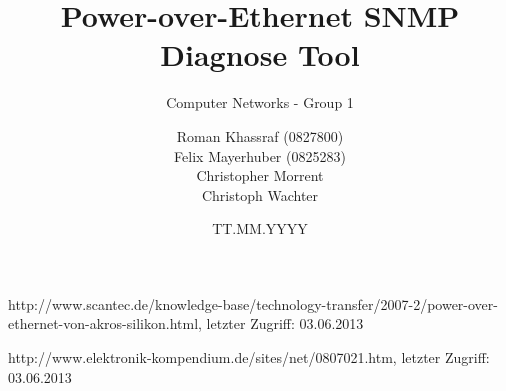 \documentclass[a4paper, 12pt]{scrartcl}
\title{Power-over-Ethernet SNMP Diagnose Tool}
\subtitle{Computer Networks - Group 1}
\author{Roman Khassraf (0827800)\\ Felix Mayerhuber (0825283) \\ Christopher Morrent \\ Christoph Wachter }
\date{TT.MM.YYYY}
\begin{document}
\maketitle







\begin{thebibliography}{4}

 http://www.scantec.de/knowledge-base/technology-transfer/2007-2/power-over-ethernet-von-akros-silikon.html, letzter Zugriff: 03.06.2013

 http://www.elektronik-kompendium.de/sites/net/0807021.htm, letzter Zugriff: 03.06.2013

\end{thebibliography}
\end{document}
